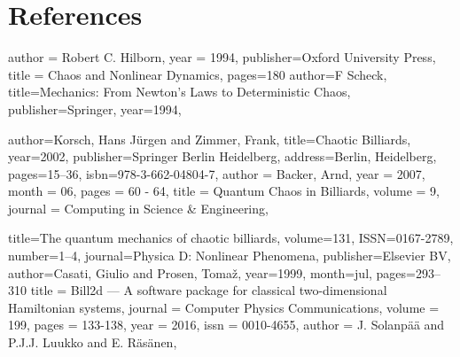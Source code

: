 \documentclass[12pt,a4paper]{amsart}
\begin{document}
\section*{References} 
\begin{biblist}
    
        {
        author = {Robert C. Hilborn},
        year = {1994},
        publisher={Oxford University Press},
        title = {Chaos and Nonlinear Dynamics},
        pages={180}
        }
        {
        author={F Scheck},
        title={Mechanics: From Newton's Laws to Deterministic Chaos},
        publisher={Springer},
        year={1994}, 
        }

        {
        author={Korsch, Hans J{\"u}rgen
        and Zimmer, Frank},
        title={Chaotic Billiards},
        year={2002},
        publisher={Springer Berlin Heidelberg},
        address={Berlin, Heidelberg},
        pages={15--36},
        isbn={978-3-662-04804-7},
        }
        {
        author = {Backer, Arnd},
        year = {2007},
        month = {06},
        pages = {60 - 64},
        title = {Quantum Chaos in Billiards},
        volume = {9},
        journal = {Computing in Science \& Engineering},
        }

    {
        title={The quantum mechanics of chaotic billiards},
       volume={131},
       ISSN={0167-2789},
       number={1–4},
       journal={Physica D: Nonlinear Phenomena},
       publisher={Elsevier BV},
       author={Casati, Giulio and Prosen, Tomaž},
       year={1999},
       month=jul, pages={293–310} 
   }
    {
        title = {Bill2d — A software package for classical two-dimensional Hamiltonian systems},
        journal = {Computer Physics Communications},
        volume = {199},
        pages = {133-138},
        year = {2016},
        issn = {0010-4655},
        author = {J. Solanpää and P.J.J. Luukko and E. Räsänen},
    }

\end{biblist}
\end{document}
